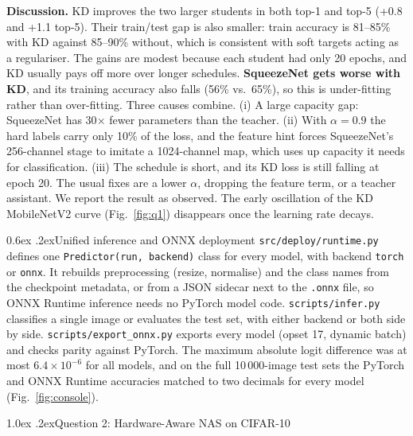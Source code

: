 \documentclass[10pt,a4paper]{article}
\makeatletter
\renewcommand\section{\@startsection{section}{1}{\z@}{-2.2ex \@plus -1ex \@minus -.2ex}%
  {1.0ex \@plus .2ex}{\normalfont\large\bfseries}}
\renewcommand\subsection{\@startsection{subsection}{2}{\z@}{-1.6ex\@plus -1ex \@minus -.2ex}%
  {0.6ex \@plus .2ex}{\normalfont\normalsize\bfseries}}
\newcommand{\code}[1]{\texttt{\small #1}}
\makeatother
\begin{document}
\textbf{Discussion.} KD improves the two larger students in both top-1 and top-5 (+0.8 and +1.1 top-5).
Their train/test gap is also smaller: train accuracy is 81--85\% with KD against 85--90\% without, which
is consistent with soft targets acting as a regulariser. The gains are modest because each student
had only 20 epochs, and KD usually pays off more over longer schedules. \textbf{SqueezeNet gets worse
with KD}, and its training accuracy also falls (56\% vs.\ 65\%), so this is under-fitting rather than
over-fitting. Three causes combine. (i) A large capacity gap: SqueezeNet has 30$\times$ fewer
parameters than the teacher. (ii) With $\alpha{=}0.9$ the hard labels carry only 10\% of the
loss, and the feature hint forces SqueezeNet's 256-channel stage to imitate a 1024-channel map, which
uses up capacity it needs for classification. (iii) The schedule is short, and its KD loss is
still falling at epoch 20. The usual fixes are a lower $\alpha$, dropping the feature term, or a teacher
assistant. We report the result as observed. The early oscillation of the KD MobileNetV2 curve
(Fig.~\ref{fig:q1}) disappears once the learning rate decays.

\subsection{Unified inference and ONNX deployment}
\code{src/deploy/runtime.py} defines one \code{Predictor(run, backend)} class for every model,
with backend \code{torch} or \code{onnx}. It rebuilds preprocessing (resize, normalise) and the class
names from the checkpoint metadata, or from a JSON sidecar next to the \code{.onnx} file, so ONNX
Runtime inference needs no PyTorch model code. \code{scripts/infer.py} classifies a single image or
evaluates the test set, with either backend or both side by side. \code{scripts/export\_onnx.py}
exports every model (opset 17, dynamic batch) and checks parity against PyTorch. The maximum absolute
logit difference was at most $6.4{\times}10^{-6}$ for all models, and on the full 10\,000-image test sets
the PyTorch and ONNX Runtime accuracies matched to two decimals for every model (Fig.~\ref{fig:console}).

\section{Question 2: Hardware-Aware NAS on CIFAR-10}
\end{document}
